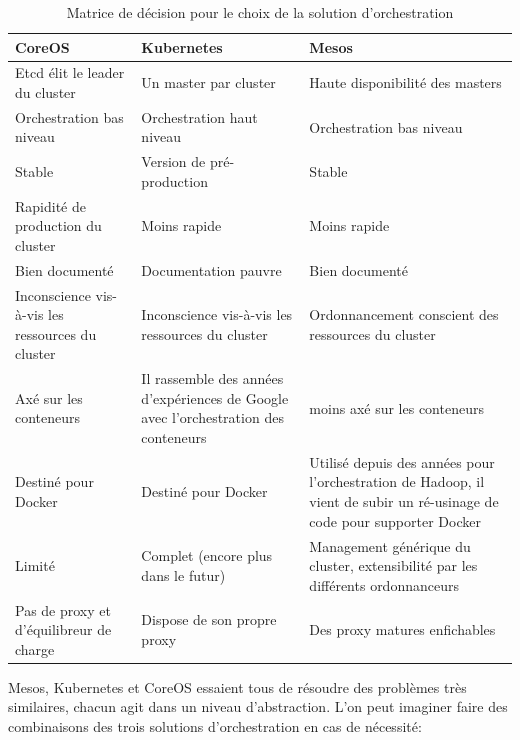 {
\begin{center}
\begin{table}[H]

	\begin{tabu}{| X[c] | X[c] | X[c] |} 


	\hline
	\textbf{CoreOS} & \textbf{Kubernetes} & \textbf{Mesos}\\ [0.95ex] 
	\hline\hline
	Etcd élit le leader du cluster 	& Un master par cluster & Haute disponibilité des masters \\ 
	Orchestration bas niveau & Orchestration haut niveau & Orchestration bas niveau \\ 
	Stable					& Version de pré-production & Stable \\ 
	Rapidité de production du cluster & Moins rapide & Moins rapide \\ 
	Bien documenté & Documentation pauvre & Bien documenté \\ 
	Inconscience vis-à-vis les ressources du cluster & Inconscience vis-à-vis les ressources du cluster & Ordonnancement conscient des ressources du cluster \\ 
	Axé sur les conteneurs & Il rassemble des années d'expériences de Google avec l'orchestration des conteneurs	& moins axé sur les conteneurs \\ 
	Destiné pour Docker & Destiné pour Docker	& Utilisé depuis des années pour l'orchestration de Hadoop, il vient de subir un ré-usinage de code pour supporter Docker \\ 
	Limité & Complet (encore plus dans le futur) & Management générique du cluster, extensibilité par les différents ordonnanceurs \\ 
	Pas de proxy et d'équilibreur de charge & Dispose de son propre proxy & Des proxy matures enfichables \\ 
	\hline
	\end{tabu}
	\caption{Matrice de décision pour le choix de la solution d'orchestration}
	\label{tab:table_label}

\end{table}
\end{center}
}


Mesos, Kubernetes et CoreOS essaient tous de résoudre des problèmes très similaires, chacun agit dans un niveau d'abstraction. L'on peut imaginer faire des combinaisons des trois solutions d'orchestration en cas de nécessité:

